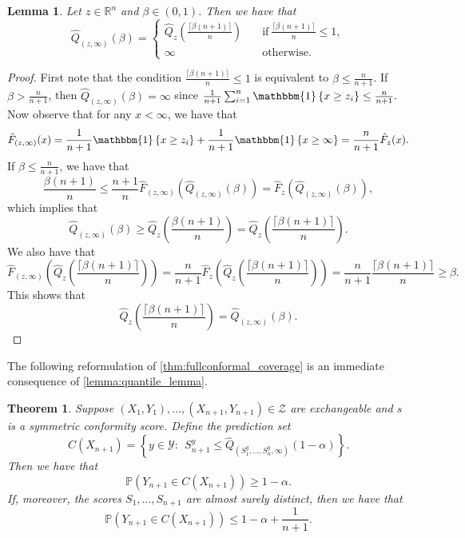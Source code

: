 \documentclass[11pt, titlepage]{article} %
\newcommand{\R}{\mathrm}
\newcommand{\Prob}[1]{\mathbb{P}\left( #1 \right)}
\newcommand{\Ind}[1]{\mathbbm{1}\left\{ #1 \right\}}
\numberwithin{equation}{section}
\newtheorem{theorem}{Theorem}
\newtheorem{lemma}{Lemma}
\theoremstyle{definition}
\numberwithin{theorem}{section}
\numberwithin{lemma}{section}
\numberwithin{corollary}{section}
\numberwithin{proposition}{section}
\numberwithin{definition}{section}
\numberwithin{remark}{section}
\begin{document}
\begin{lemma}
    Let \(z \in \mathbb{R}^n\) and \(\beta \in (0,1)\). Then we have that \[\hat{Q}_{(z,\infty)} (\beta) = \begin{cases}
        \hat{Q}_z\left( \frac{\lceil \beta (n+1) \rceil }{n} \right) \quad &\R{if} \ \frac{\lceil \beta(n+1) \rceil}{n} \leq 1, \\
        \infty \quad &\R{otherwise}.
        \end{cases}\]
\label{lemma:quantile_lemma_extra}
\end{lemma}
\begin{proof}
    First note that the condition \(\frac{\lceil \beta(n+1) \rceil}{n} \leq 1\) is equivalent to \(\beta \leq \frac{n}{n+1}\). If \(\beta > \frac{n}{n+1}\), then \(\hat{Q}_{(z, \infty)}(\beta) = \infty\) since \(\frac{1}{n+1}\sum_{i=1}^n \Ind{x \geq z_i} \leq \frac{n}{n+1}.\) Now observe that for any \(x < \infty\), we have that \[\hat{F}_{(z, \infty)}(x) = \frac{1}{n+1} \Ind{x \geq z_i} + \frac{1}{n+1}\Ind{x \geq \infty} = \frac{n}{n+1} \hat{F}_z(x).\] If \(\beta \leq \frac{n}{n+1}\), we have that \[\frac{\beta(n+1)}{n} \leq \frac{n+1}{n}  \hat{F}_{(z,\infty)}(\hat{Q}_{(z,\infty)}(\beta)) = \hat{F}_{z}(\hat{Q}_{(z,\infty)}(\beta)),\] which implies that \[\hat{Q}_{(z,\infty)}(\beta) \geq \hat{Q}_{z}\left(\frac{\beta(n+1)}{n}\right) = \hat{Q}_z\left( \frac{\lceil \beta (n+1) \rceil }{n} \right).\] We also have that \[\hat{F}_{(z, \infty)}\left( \hat{Q}_z\left( \frac{\lceil \beta (n+1) \rceil }{n} \right) \right) = \frac{n}{n+1} \hat{F}_{z}\left( \hat{Q}_z\left( \frac{\lceil \beta (n+1) \rceil }{n} \right) \right) = \frac{n}{n+1}\frac{\lceil \beta (n+1) \rceil }{n} \geq \beta. \] This shows that \[\hat{Q}_z\left( \frac{\lceil \beta (n+1) \rceil }{n} \right) = \hat{Q}_{(z, \infty)}(\beta).\]
\end{proof}

\noindent The following reformulation of \cref{thm:fullconformal_coverage} is an immediate consequence of \cref{lemma:quantile_lemma}.

\begin{theorem}
    Suppose \((X_1, Y_1), \ldots, (X_{n+1}, Y_{n+1}) \in \mathcal{Z}\) are exchangeable and \(s\) is a symmetric conformity score. Define the prediction set \begin{equation}
        C(X_{n+1}) = \left\{ y \in \mathcal{Y}: \ \ S_{n+1}^y \leq \hat{Q}_{(S_1^y, \ldots, S_n^y, \infty)}(1-\alpha)  \right\}.
    \label{eqn:fullconformal_prediction_set_v2}
    \end{equation} Then we have that \[\Prob{Y_{n+1} \in C(X_{n+1})} \geq 1-\alpha.\] If, moreover, the scores \(S_1, \ldots, S_{n+1}\) are almost surely distinct, then we have that \[\Prob{Y_{n+1} \in C(X_{n+1})} \leq 1-\alpha + \frac{1}{n+1}.\]

\label{thm:fullconformal_coverage_v2}  
\end{theorem}
\end{document}
